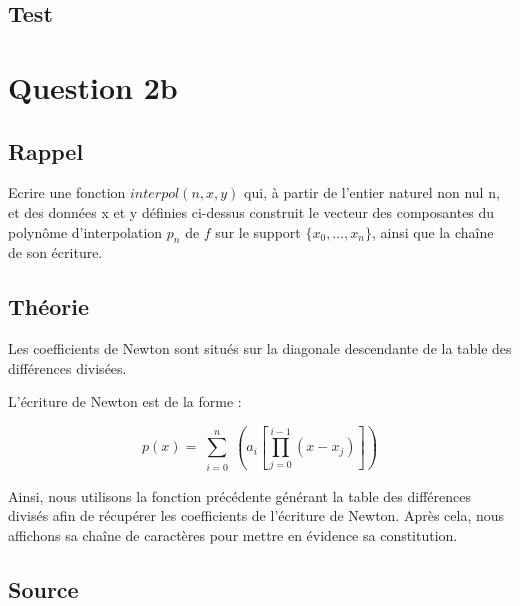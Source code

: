 \documentclass[a4paper,10pt]{report}
\begin{document}
\begin{center}
	
\end{center}

\subsection*{Test}

\section*{Question 2b}

\subsection*{Rappel}

Ecrire une fonction $interpol(n, x, y)$ qui, à partir de l’entier naturel non
nul n, et des données x et y définies ci-dessus construit le vecteur des
composantes du polynôme d’interpolation $p_{n}$ de $f$ sur le support $\lbrace  x_{0},...,x_{n} \rbrace$,
ainsi que la chaîne de son écriture.

\subsection*{Théorie}

Les coefficients de Newton sont situés sur la diagonale descendante de la table des différences divisées. 

L’écriture de Newton est de la forme :

\begin{equation}
p(x) = \sum_{\substack{i=0}}^{n} \left(a_{i}\left[\prod_{j=0}^{i-1}(x-x_{j})\right]\right)
\end{equation}

Ainsi, nous utilisons la fonction précédente générant la table des différences divisés afin de récupérer les coefficients de l’écriture de Newton. Après cela, nous affichons sa chaîne de caractères pour mettre en évidence sa constitution. 

\newpage
\subsection*{Source}
\end{document}
